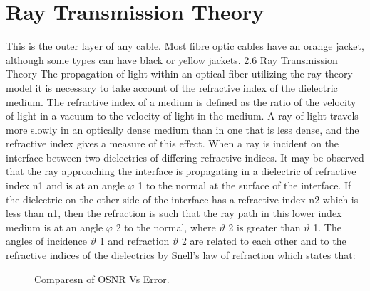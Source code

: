 \documentclass[12pt]{report}
\begin{document}
	\section{Ray Transmission Theory}
	This is the outer layer of any cable. Most fibre optic cables have an orange jacket, although some types can have black or yellow jackets. 2.6 Ray Transmission Theory 
	The propagation of light within an optical fiber utilizing the ray theory model it is necessary to take account of the refractive index of the dielectric medium. The refractive index of a medium is defined as the ratio of the velocity of light in a vacuum to the velocity of light in the medium. A ray of light travels more slowly in an optically dense medium than in one that is less dense, and the refractive index gives a measure of this effect. When a ray is incident on the interface between two dielectrics of differing refractive indices. It may be observed that the ray approaching the interface is propagating in a dielectric of refractive index n1 and is at an angle $\varphi$ 1 to the normal at the surface of the interface. If the dielectric on the other side of the interface has a refractive index n2 which is less than n1, then the refraction is such that the ray path in this lower index medium is at an angle $\varphi$ 2 to the normal, where $\vartheta$ 2 is greater than $\vartheta$ 1. The angles of incidence $\vartheta$ 1 and refraction $\vartheta$ 2 are related to each other and to the refractive indices of the dielectrics by Snell’s law of refraction which states that:
	\begin{figure}[htbp]
		\caption{Comparesn of OSNR Vs Error.}
		\label{fig1}
	\end{figure}
\end{document}
